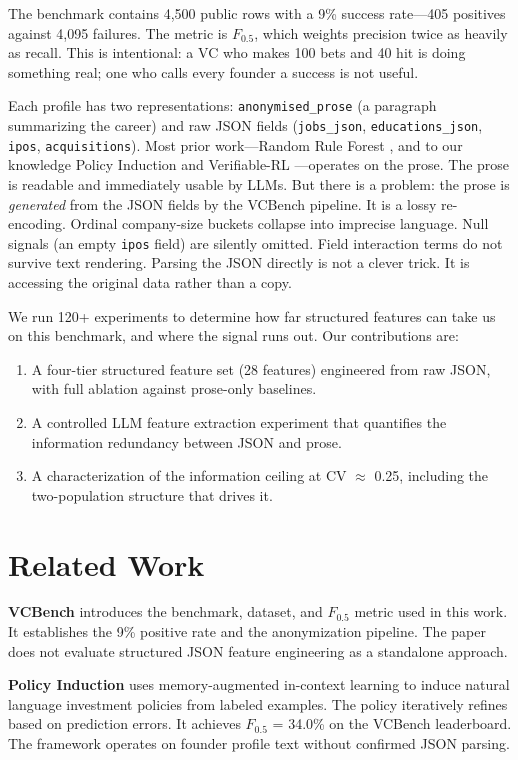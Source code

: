 \documentclass[10pt, conference]{IEEEtran}
\begin{document}
The benchmark contains 4,500 public rows with a 9\% success rate---405 positives against 4,095 failures. The metric is $F_{0.5}$, which weights precision twice as heavily as recall. This is intentional: a VC who makes 100 bets and 40 hit is doing something real; one who calls every founder a success is not useful.

Each profile has two representations: \texttt{anonymised\_prose} (a paragraph summarizing the career) and raw JSON fields (\texttt{jobs\_json}, \texttt{educations\_json}, \texttt{ipos}, \texttt{acquisitions}). Most prior work---Random Rule Forest \cite{rrf}, and to our knowledge Policy Induction \cite{policy} and Verifiable-RL \cite{trl}---operates on the prose. The prose is readable and immediately usable by LLMs. But there is a problem: the prose is \textit{generated} from the JSON fields by the VCBench pipeline. It is a lossy re-encoding. Ordinal company-size buckets collapse into imprecise language. Null signals (an empty \texttt{ipos} field) are silently omitted. Field interaction terms do not survive text rendering. Parsing the JSON directly is not a clever trick. It is accessing the original data rather than a copy.

We run 120+ experiments to determine how far structured features can take us on this benchmark, and where the signal runs out. Our contributions are:
\begin{enumerate}
  \item A four-tier structured feature set (28 features) engineered from raw JSON, with full ablation against prose-only baselines.
  \item A controlled LLM feature extraction experiment that quantifies the information redundancy between JSON and prose.
  \item A characterization of the information ceiling at CV $\approx$ 0.25, including the two-population structure that drives it.
\end{enumerate}

\section{Related Work}

\textbf{VCBench} \cite{vcbench} introduces the benchmark, dataset, and $F_{0.5}$ metric used in this work. It establishes the 9\% positive rate and the anonymization pipeline. The paper does not evaluate structured JSON feature engineering as a standalone approach.

\textbf{Policy Induction} \cite{policy} uses memory-augmented in-context learning to induce natural language investment policies from labeled examples. The policy iteratively refines based on prediction errors. It achieves $F_{0.5}$ = 34.0\% on the VCBench leaderboard. The framework operates on founder profile text without confirmed JSON parsing.
\end{document}
